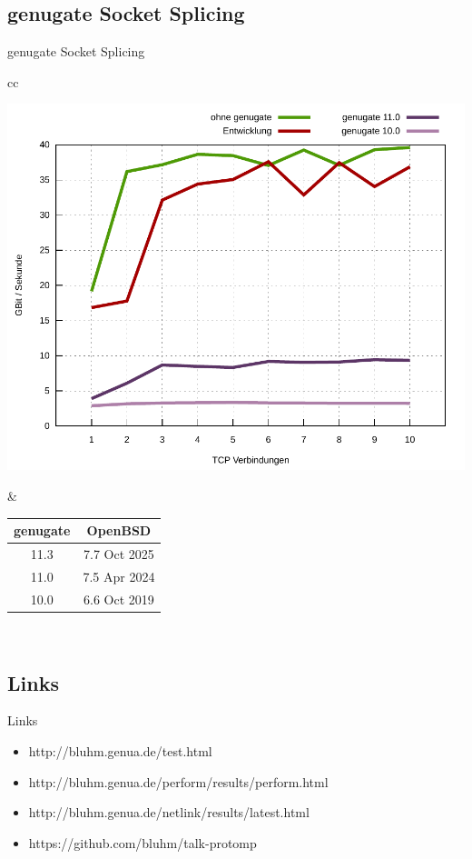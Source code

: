 \documentclass[14pt,aspectratio=169]{beamer}
\begin{document}
\subsection{genugate Socket Splicing}
\begin{frame}{genugate Socket Splicing}
\begin{tabular}{cc}
	\begin{minipage}{.6\linewidth}
	    \includegraphics[height=0.8\textheight]{images/10vs11-dev.pdf}
	\end{minipage}
    &
	\begin{minipage}{.3\linewidth}
	    \small
	    \begin{tabular}{c|c}
		genugate   & OpenBSD \\
		\hline
		11.3       & 7.7 Oct 2025 \\
		11.0       & 7.5 Apr 2024 \\
		10.0       & 6.6 Oct 2019 \\
	    \end{tabular}
	\end{minipage}
    \\
\end{tabular}
\end{frame}

\subsection{Links}
\begin{frame}{Links}
\begin{itemize}
    \item http://bluhm.genua.de/test.html
    \item http://bluhm.genua.de/perform/results/perform.html
    \item http://bluhm.genua.de/netlink/results/latest.html
    \item https://github.com/bluhm/talk-protomp
\end{itemize}
\end{frame}
\end{document}

